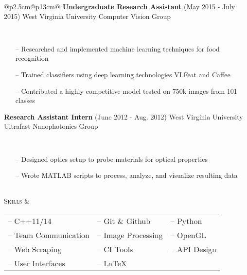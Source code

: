 \documentclass{article}
\begin{document}
\begin{tabular}{@{}p{2.5cm}@{\hspace{0.2cm}}p{13cm}@{}}
\textbf{Undergraduate Research Assistant}
\hfill\small(May 2015 - July 2015)\normalsize
\newline West Virginia University Computer Vision Group
\par\,\small
\begin{itemize}[leftmargin=*,nolistsep,noitemsep]
  \item[--]Researched and implemented machine learning techniques for food recognition
  \item[--]Trained classifiers using deep learning technologies VLFeat and Caffee
  \item[--]Contributed a highly competitive model tested on 750k images from 101 classes
\newline
\end{itemize}
\normalsize

\textbf{Research Assistant Intern}
\hfill\small(June 2012 - Aug. 2012)\normalsize
\newline West Virginia University Ultrafast Nanophotonics Group
\par\,\small
\begin{itemize}[leftmargin=*, nolistsep,noitemsep]
  \item[--]Designed optics setup to probe materials for optical properties
  \item[--]Wrote MATLAB scripts to process, analyze, and visualize resulting data
\end{itemize}
\normalsize \\


\textsc{Skills} &
\begin{tabular}{@{}lll@{}}

-- C++11/14 &
-- Git \& Github &
-- Python \\

-- Team Communication &
-- Image Processing &
-- OpenGL \\

-- Web Scraping &
-- CI Tools &
-- API Design \\

-- User Interfaces &
-- \LaTeX \\


\end{tabular}
\end{tabular}
\end{document}
